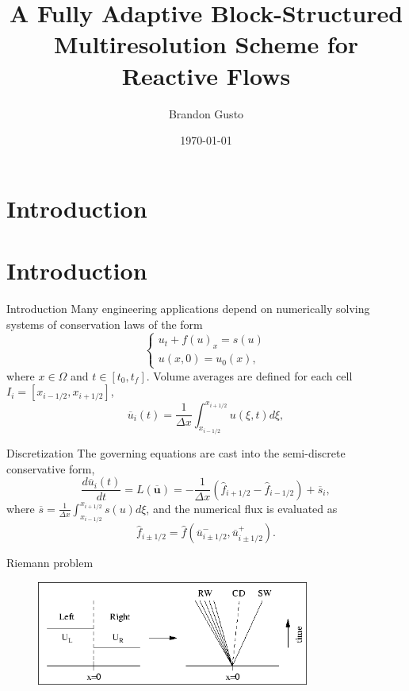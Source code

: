 \documentclass{beamer}
\begin{document}
\section{Introduction}
\title{A Fully Adaptive Block-Structured Multiresolution Scheme for
Reactive Flows}
\author{Brandon Gusto} %
\date{\today}
\frame{\titlepage}

\section{Introduction}

\begin{frame}{Introduction}
    Many engineering applications depend on numerically solving systems of conservation laws of the form
    \begin{equation}
    \begin{cases}
      u_{t} + f(u)_{x} = s(u) \\    
      u(x,0) = u_{0}(x),
    \end{cases}
    \label{claw}
    \end{equation}
    where $x \in \Omega$ and $t \in [t_{0},t_{f}]$.
    Volume averages are defined for each cell $I_{i} =
    \left[x_{i-1/2},x_{i+1/2}\right]$,
    \begin{equation}
        \overline{u}_{i}(t) = \frac{1}{\Delta x} \int_{x_{i-1/2}}^{x_{i+1/2}} u(\xi,t) d \xi,
    \end{equation}
\end{frame}

\begin{frame}{Discretization}
    The governing equations are cast into the semi-discrete conservative form,
    \begin{equation}
        \frac{d \overline{u}_{i}(t)}{dt} = L(\overline{\bm{u}}) = -\frac{1}{\Delta x} \left( \hat{f}_{i+1/2} -
        \hat{f}_{i-1/2} \right) + \overline{s}_{i},
        \label{ode}
    \end{equation}
    where $\overline{s} = \frac{1}{\Delta x} \int_{x_{i-1/2}}^{x_{i+1/2}} s(u) d
    \xi$, and the numerical flux is evaluated as
    \begin{equation}
        \hat{f}_{i\pm1/2} = \hat{f}(\overline{u}^{-}_{i\pm1/2}, \overline{u}^{+}_{i\pm1/2}).
    \end{equation}
\end{frame}

\begin{frame}{Riemann problem}
    \begin{figure}
        \center
        \includegraphics[width=0.8\textwidth]{riemann.png}
    \end{figure}
\end{frame}
\end{document}
